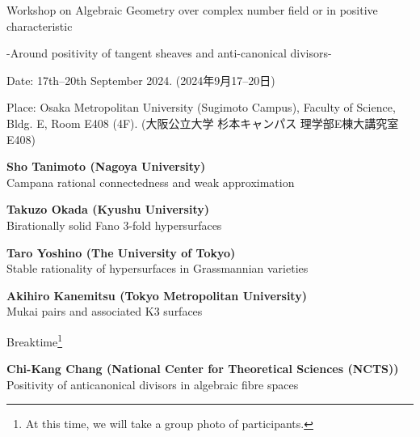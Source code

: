 \documentclass[dvipdfmx,a4paper,12pt]{article}
\theoremstyle{plain} %
\theoremstyle{definition} %
\begin{document}
\begin{center}
  {\LARGE Workshop on Algebraic Geometry over complex number field or in positive characteristic}
 
  {\large -Around positivity of tangent sheaves and anti-canonical divisors-}
  \end{center}
  
\vskip5mm
\begin{flushleft}
{ Date: 17th--20th September 2024. (2024年9月17--20日)}


{Place: Osaka Metropolitan University (Sugimoto Campus), Faculty of Science, Bldg. E, Room E408 (4F). }
{(大阪公立大学 杉本キャンパス 理学部E棟大講究室 E408)}

\end{flushleft}




\vskip8mm
\vskip3mm

\vskip1mm
{\bf Sho Tanimoto (Nagoya University)}\\
 Campana rational connectedness and weak approximation
\vskip3mm

{\bf Takuzo Okada (Kyushu University)}\\
Birationally solid Fano 3-fold hypersurfaces
\vskip3mm

{\bf Taro Yoshino (The University of Tokyo)}\\
Stable rationality of hypersurfaces in Grassmannian varieties
\vskip5mm


\vskip1mm
{\bf Akihiro Kanemitsu (Tokyo Metropolitan University)}\\
Mukai pairs and associated K3 surfaces
\vskip3mm

 Breaktime\footnote{At this time, we will take a group photo of participants.}
\vskip3mm

{\bf Chi-Kang Chang (National Center for Theoretical Sciences (NCTS)) }\\
Positivity of anticanonical divisors in algebraic fibre spaces
\vskip3mm
\end{document}
